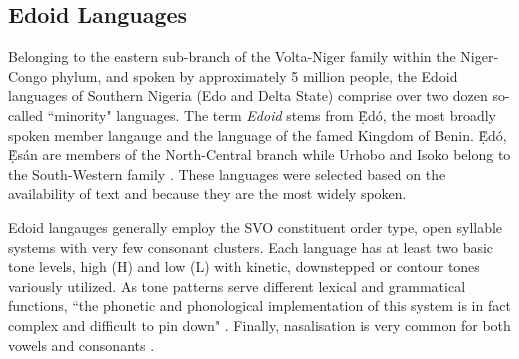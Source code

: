 \documentclass{article} %
\begin{document}

\subsection{Edoid Languages}


Belonging to the eastern sub-branch of the Volta-Niger family within the Niger-Congo phylum, and spoken by approximately 5 million people, the Edoid languages of Southern Nigeria (Edo and Delta State) comprise over two dozen so-called ``minority" languages. The term \emph{Edoid} stems from \d{\`E}d{\'o}, the most broadly spoken member langauge and the language of the famed Kingdom of Benin. \d{\`E}d{\'o}, \d{\`E}s{\'a}n are members of the North-Central branch while Urhobo and Isoko belong to the South-Western family \citep{wiki_Edoid}. These languages were selected based on the availability of text and because they are the most widely spoken.

Edoid langauges generally employ the SVO constituent order type, open syllable systems with very few consonant clusters. Each language has at least two basic tone levels, high (H) and low (L) with kinetic, downstepped or contour tones variously utilized. As tone patterns serve different lexical and grammatical functions, ``the phonetic and phonological implementation of this system is in fact complex and difficult to pin down" \citep{rolle2013phonetics, ogie2009multi, adeniyi2010tone, ilolo2013vowel}. Finally, nasalisation is very common for both vowels and consonants \citep{Elugbe_1989, isoko_phonetics, ikoyo2018phonetic}. 

\end{document}
